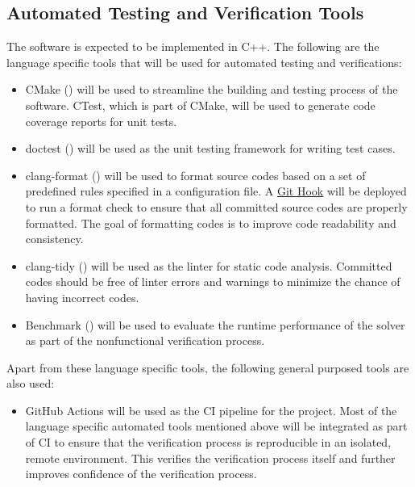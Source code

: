 \documentclass[12pt, titlepage]{article}
\begin{document}
\subsection{Automated Testing and Verification Tools}
\label{sec:autom-test-verif}

The software is expected to be implemented in C++. The following are the
language specific tools that will be used for automated testing and
verifications:

\begin{itemize}
\item CMake (\cite{noauthor_cmake_nodate}) will be used to streamline the building and
  testing process of the software. CTest, which is part of CMake, will be used
  to generate code coverage reports for unit tests.
\item doctest (\cite{noauthor_doctestdoctest_2025}) will be used as the unit testing
  framework for writing test cases.
\item clang-format (\cite{noauthor_clangformat_nodate}) will be used to format source
  codes based on a set of predefined rules specified in a configuration file. A
  \href{https://git-scm.com/book/ms/v2/Customizing-Git-Git-Hooks}{Git Hook} will
  be deployed to run a format check to ensure that all committed source codes
  are properly formatted. The goal of formatting codes is to improve code
  readability and consistency.
\item clang-tidy (\cite{noauthor_clang-tidy_nodate}) will be used as the linter for
  static code analysis. Committed codes should be free of linter errors and
  warnings to minimize the chance of having incorrect codes.
\item Benchmark (\cite{noauthor_googlebenchmark_2025}) will be used to evaluate the
  runtime performance of the solver as part of the nonfunctional verification
  process.
\end{itemize}

Apart from these language specific tools, the following general purposed tools
are also used:

\begin{itemize}
\item GitHub Actions will be used as the CI pipeline for the project. Most of the
  language specific automated tools mentioned above will be integrated as part
  of CI to ensure that the verification process is reproducible in an isolated,
  remote environment. This verifies the verification process itself and further
  improves confidence of the verification process.
\end{itemize}
\end{document}
